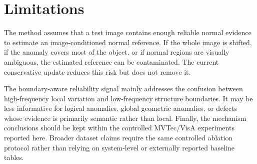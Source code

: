 \section{Limitations}
\label{sec:limitations}

The method assumes that a test image contains enough reliable normal evidence
to estimate an image-conditioned normal reference. If the whole image is
shifted, if the anomaly covers most of the object, or if normal regions are
visually ambiguous, the estimated reference can be contaminated. The current
conservative update reduces this risk but does not remove it.

The boundary-aware reliability signal mainly addresses the confusion between
high-frequency local variation and low-frequency structure boundaries. It may
be less informative for logical anomalies, global geometric anomalies, or
defects whose evidence is primarily semantic rather than local. Finally, the
mechanism conclusions should be kept within the controlled MVTec/VisA
experiments reported here. Broader dataset claims require the same controlled
ablation protocol rather than relying on system-level or externally reported
baseline tables.
